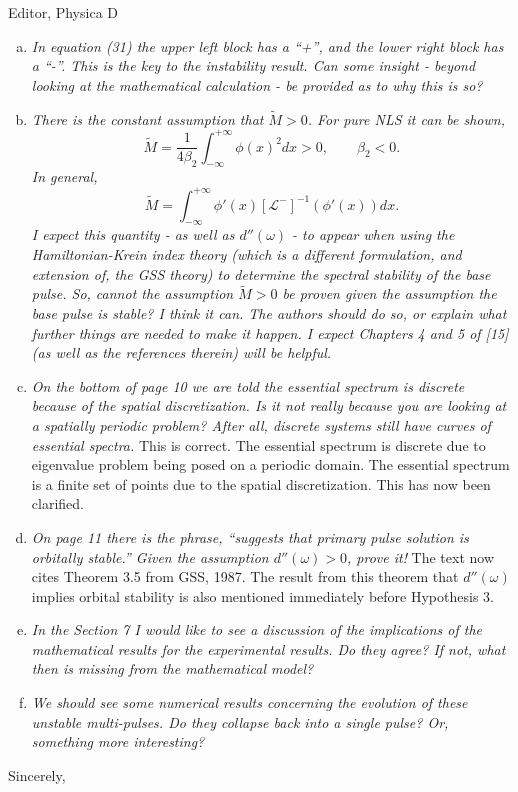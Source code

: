 \documentclass[11pt]{letter}
\begin{document}
\begin{letter}{Editor, Physica D}
\begin{enumerate}[(a)]
\item \emph{In equation (31) the upper left block has a ``+'', and the lower right block has a ``-''. This is the key to the instability result. Can some insight - beyond looking at the mathematical calculation - be provided as to why this is so?}
\vspace{4mm}

\item \emph{There is the constant assumption that $\tilde{M} > 0$. For pure NLS it can be shown, 
\[
\tilde{M} = \frac{1}{4 \beta_2} \int_{-\infty}^{+\infty} \phi(x)^2 dx > 0, \qquad \beta_2 < 0.
\]
In general,
\[
\tilde{M} = \int_{-\infty}^{+\infty} \phi'(x)[\mathcal{L^-}]^{-1}(\phi'(x)) dx.
\]
I expect this quantity - as well as $d''(\omega)$ - to appear when using the Hamiltonian-Krein index theory (which is a different formulation, and extension of, the GSS theory) to determine the spectral stability of the base pulse. So, cannot the assumption $\tilde{M} > 0$ be proven given the assumption the base pulse is stable? I think it can. The authors should do so, or explain what further things are needed to make it happen. I expect Chapters 4 and 5 of [15] (as well as the references therein) will be helpful. }
\vspace{4mm}

\item \emph{On the bottom of page 10 we are told the essential spectrum is discrete because of the spatial discretization. Is it not really because you are looking at a spatially periodic problem? After all, discrete systems still have curves of essential spectra.} This is correct. The essential spectrum is discrete due to eigenvalue problem being posed on a periodic domain. The essential spectrum is a finite set of points due to the spatial discretization. This has now been clarified.
\vspace{4mm}

\item \emph{On page 11 there is the phrase, ``suggests that primary pulse solution is orbitally stable.'' Given the assumption $d''(\omega) > 0$, prove it!} The text now cites Theorem 3.5 from GSS, 1987. The result from this theorem that $d''(\omega)$ implies orbital stability is also mentioned immediately before Hypothesis 3.
\vspace{4mm}

\item \emph{In the Section 7 I would like to see a discussion of the implications of the mathematical results for the experimental results. Do they agree? If not, what then is missing from the mathematical model?} 
\vspace{4mm}

\item \emph{We should see some numerical results concerning the evolution of these unstable multi-pulses. Do they collapse back into a single pulse? Or, something more interesting?}
\vspace{4mm}

\end{enumerate}

\closing{Sincerely,}

\end{letter}
\end{document}
